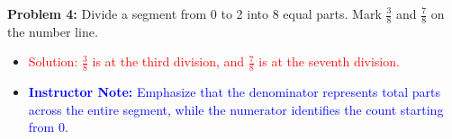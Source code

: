 \documentclass[12pt]{article}
\begin{document}
\begin{tcolorbox}
\vspace{1em}

\textbf{Problem 4:} Divide a segment from 0 to 2 into 8 equal parts. Mark \( \frac{3}{8} \) and \( \frac{7}{8} \) on the number line.
\begin{center}
\end{center}
\begin{itemize}
    \item \textcolor{red}{Solution: \( \frac{3}{8} \) is at the third division, and \( \frac{7}{8} \) is at the seventh division.}
    \item \textcolor{blue}{\textbf{Instructor Note:} Emphasize that the denominator represents total parts across the entire segment, while the numerator identifies the count starting from 0.}
\end{itemize}

\vspace{1em}


\end{tcolorbox}

\vspace{1em}
\end{document}
